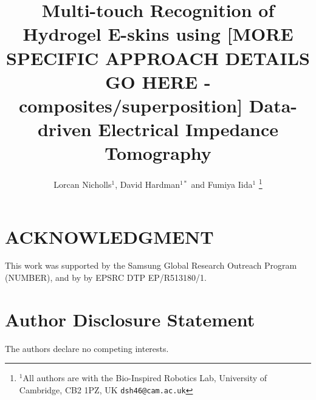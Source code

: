 \documentclass[letterpaper, 10 pt, conference]{ieeeconf}  %
\title{\LARGE \bf
Multi-touch Recognition of Hydrogel E-skins using [MORE SPECIFIC APPROACH DETAILS GO HERE - composites/superposition] Data-driven Electrical Impedance Tomography
}
\author{Lorcan Nicholls$^{1}$, David Hardman$^{1*}$ and Fumiya Iida$^{1}$%
\thanks{$^{1}$All authors are with the Bio-Inspired Robotics Lab, University of Cambridge, CB2 1PZ, UK
        {\tt\small dsh46@cam.ac.uk}}%
}
\begin{document}
\maketitle
\thispagestyle{empty}
\pagestyle{empty}



\addtolength{\textheight}{-12cm}   %









\section*{ACKNOWLEDGMENT}
This work was supported by the Samsung Global Research Outreach Program (NUMBER), and by by EPSRC  DTP EP/R513180/1.

\section*{Author Disclosure Statement}
The authors declare no competing interests.



\end{document}
